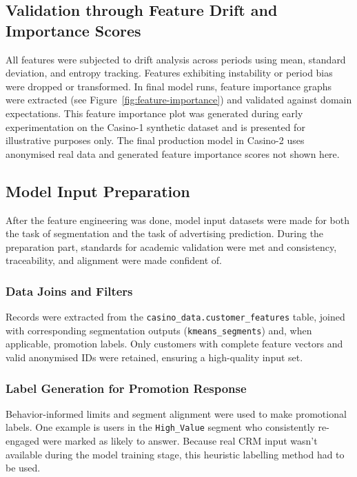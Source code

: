 \documentclass[12pt,a4paper]{report}
\begin{document}
\subsection{Validation through Feature Drift and Importance Scores}

All features were subjected to drift analysis across periods using mean, standard deviation, and entropy tracking. Features exhibiting instability or period bias were dropped or transformed. In final model runs, feature importance graphs were extracted (see Figure~\ref{fig:feature-importance}) and validated against domain expectations. This feature importance plot was generated during early experimentation on the Casino-1 synthetic dataset and is presented for illustrative purposes only. The final production model in Casino-2 uses anonymised real data and generated feature importance scores not shown here.


\subsection{Model Input Preparation}
\label{sec:model_input_preparation}

After the feature engineering was done, model input datasets were made for both the task of segmentation and the task of advertising prediction.  During the preparation part, standards for academic validation were met and consistency, traceability, and alignment were made confident of.

\subsubsection*{Data Joins and Filters}

Records were extracted from the \texttt{casino\_data.customer\_features} table, joined with corresponding segmentation outputs (\texttt{kmeans\_segments}) and, when applicable, promotion labels. Only customers with complete feature vectors and valid anonymised IDs were retained, ensuring a high-quality input set.

\subsubsection*{Label Generation for Promotion Response}

Behavior-informed limits and segment alignment were used to make promotional labels. One example is users in the \texttt{High\_Value} segment who consistently re-engaged were marked as likely to answer. Because real CRM input wasn't available during the model training stage, this heuristic labelling method had to be used.
\end{document}
